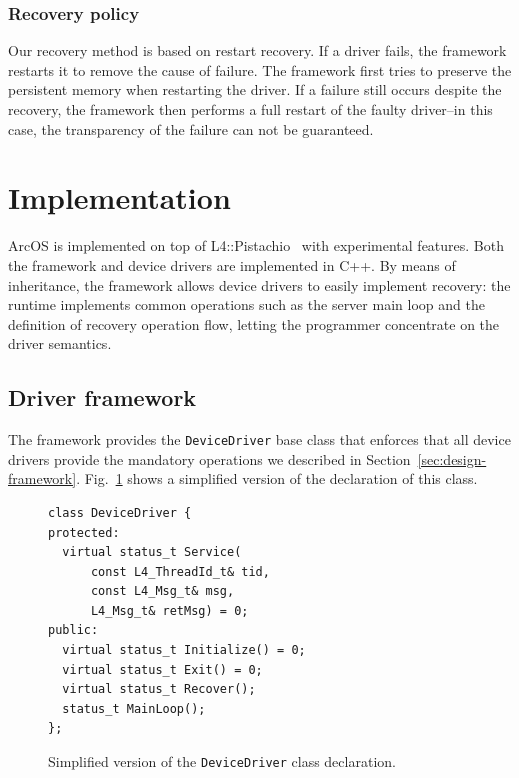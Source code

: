 \documentclass[times, 10pt, twocolumn]{article}
\begin{document}


\subsubsection{Recovery policy}

Our recovery method is based on restart recovery.  If a driver fails, the framework restarts it to remove the cause of failure.  The framework first tries to preserve the persistent memory when restarting the driver.  If a failure still occurs despite the recovery, the framework then performs a full restart of the faulty driver--in this case, the transparency of the failure can not be guaranteed.

\section{Implementation}
\label{s:impl}

ArcOS is implemented on top of L4::Pistachio~\cite{L4X2} with experimental features. Both the framework and device drivers are implemented in C++.  By means of inheritance, the framework allows device drivers to easily implement recovery: the runtime implements common operations such as the server main loop and the definition of recovery operation flow, letting the programmer concentrate on the driver semantics.

\subsection{Driver framework}

The framework provides the \texttt{DeviceDriver} base class that enforces that all device drivers provide the mandatory operations we described in Section~\ref{sec:design-framework}. Fig.~\ref{fig:devicedriverclass} shows a simplified version of the declaration of this class.

\begin{figure}[ht]
\centering
\begin{screen}
\scriptsize{
\begin{verbatim}
class DeviceDriver {
protected:
  virtual status_t Service(
      const L4_ThreadId_t& tid,
      const L4_Msg_t& msg,
      L4_Msg_t& retMsg) = 0;
public:
  virtual status_t Initialize() = 0;
  virtual status_t Exit() = 0;
  virtual status_t Recover();
  status_t MainLoop();
};
\end{verbatim}
}
\end{screen}
\caption{Simplified version of the \texttt{DeviceDriver} class declaration.}
\label{fig:devicedriverclass}
\end{figure}
\end{document}
